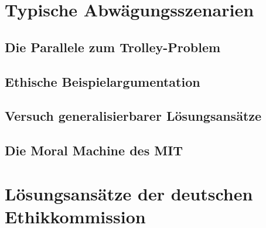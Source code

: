 \documentclass[twocolumn, german]{tum-article}
\begin{document}
\section{Typische Abwägungsszenarien}
\subsection{Die Parallele zum Trolley-Problem}
\subsection{Ethische Beispielargumentation}
\subsection{Versuch generalisierbarer Lösungsansätze}
\subsection{Die Moral Machine des MIT}

\section{Lösungsansätze der deutschen Ethikkommission}



\printbibliography
\end{document}
